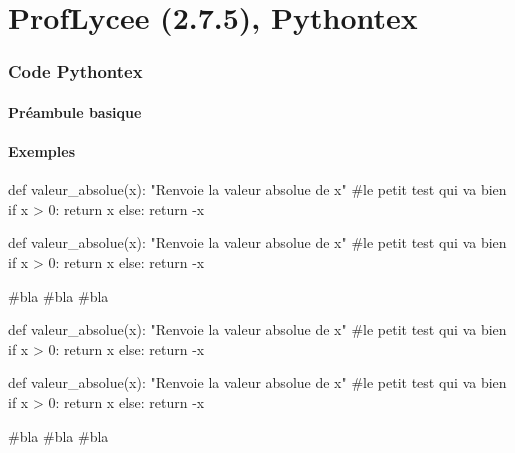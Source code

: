 \documentclass[french,a4paper,10pt]{article}
\def\PLver{2.7.5}
\begin{document}
\part*{ProfLycee (\PLver), Pythontex}

\section{Code \og Pythontex \fg{}}

\subsection{Préambule basique}

{\small {}}

\subsection{Exemples}

{\small \begin{codehigh}
\begin{CodePythontex}{}
def valeur_absolue(x):
    "Renvoie la valeur absolue de x"
    #le petit test qui va bien
    if x > 0:
        return x
    else:
    return -x
\end{CodePythontex}
\end{codehigh}}

\begin{CodePythontex}{}
def valeur_absolue(x):
	"Renvoie la valeur absolue de x"
	#le petit test qui va bien
	if x > 0:
		return x
	else:
		return -x

#bla
#bla
#bla
\end{CodePythontex}

{\small \begin{codehigh}
\begin{CodePythontexAlt}[Largeur=10cm,Centre,PremLigne=10]{}
def valeur_absolue(x):
    "Renvoie la valeur absolue de x"
    #le petit test qui va bien
    if x > 0:
        return x
    else:
    return -x
\end{CodePythontexAlt}
\end{codehigh}}

\begin{CodePythontexAlt}[Largeur=10cm,Centre,PremLigne=10]{}
def valeur_absolue(x):
	"Renvoie la valeur absolue de x"
	#le petit test qui va bien
	if x > 0:
		return x
	else:
		return -x

#bla
#bla
#bla
\end{CodePythontexAlt}
\end{document}
